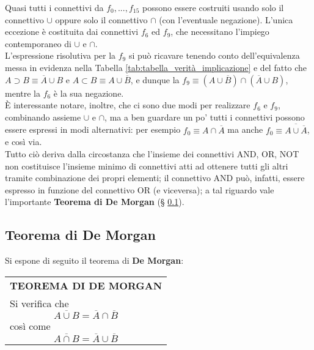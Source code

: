 \documentclass[a4paper]{extarticle}
\renewcommand\arraystretch{}
\begin{document}
\vspace{1em}
\noindent
Quasi tutti i connettivi da \(f_0, ..., f_{15}\) possono essere costruiti usando solo il connettivo \(\cup\) oppure solo il connettivo \(\cap\) (con l’eventuale negazione). L’unica eccezione è costituita dai connettivi \(f_6\) ed \(f_9\), che necessitano l’impiego contemporaneo di \(\cup\) e \(\cap\).\\
L’espressione risolutiva per la \(f_9\) si può ricavare tenendo conto dell'equivalenza messa in evidenza nella Tabella \ref{tab:tabella_verità_implicazione} e del fatto che \(A \supset B \equiv \overline{A} \cup B\) e \(A \subset B \equiv A \cup \overline{B}\), e dunque la \(f_9 \equiv (A \cup \overline{B}) \cap (\overline{A} \cup B)\), mentre la \(f_6\) è la sua negazione.\\
È interessante notare, inoltre, che ci sono due modi per realizzare \(f_6\) e \(f_9\), combinando assieme \(\cup\) e \(\cap\), ma a ben guardare un po’ tutti i connettivi possono essere espressi in modi alternativi: per esempio \(f_0 \equiv A \cap \overline{A}\) ma anche \(f_0 \equiv \overline{A \cup \overline{A}}\), e così via.\\
Tutto ciò deriva dalla circostanza che l’insieme dei connettivi AND, OR, NOT non costituisce l'insieme minimo di connettivi atti ad ottenere tutti gli altri tramite combinazione dei propri elementi; il connettivo AND può, infatti, essere espresso in funzione del connettivo OR (e viceversa); a tal riguardo vale l’importante \textbf{Teorema di De Morgan} (§ \ref{sec:teorema_de_morgan}).

\subsection{Teorema di De Morgan}
\label{sec:teorema_de_morgan}
Si espone di seguito il teorema di \textbf{De Morgan}:

\vspace{1em}
\setlength{\tabcolsep}{14pt}
\renewcommand{\arraystretch}{2}
\noindent
\begin{tabularx}{\textwidth}{@{}|P|@{}}
    \hline
    {\textbf{TEOREMA DI DE MORGAN}}\\
    \parbox{\linewidth}{Si verifica che
    \[\overline{A \cup B} = \overline{A} \cap \overline{B}\]
    così come
    \[\overline{A \cap B} = \overline{A} \cup \overline{B}\]
    \vspace{-3mm}}\\
    \hline
\end{tabularx}
\vspace{1em}
\end{document}
